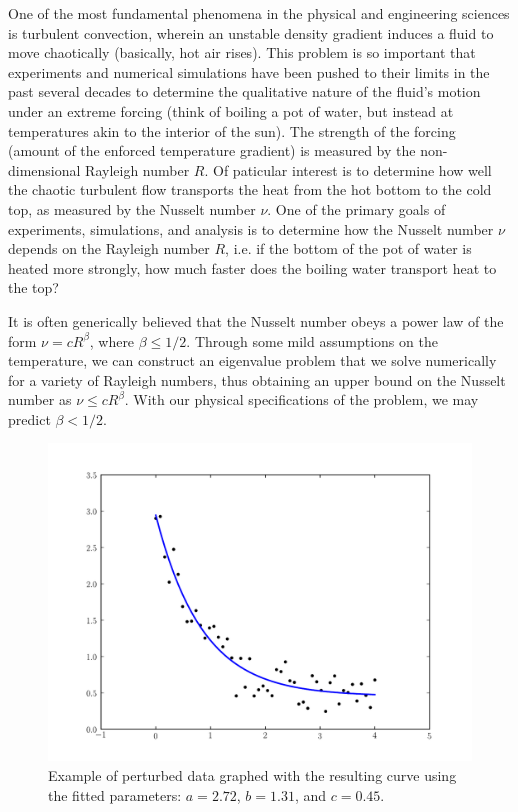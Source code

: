 One of the most fundamental phenomena in the physical and engineering sciences is turbulent convection, wherein an unstable density gradient induces a fluid to move chaotically (basically, hot air rises).  
This problem is so important that experiments and numerical simulations have been pushed to their limits in the past several decades to determine the qualitative nature of the fluid's motion under an extreme forcing (think of boiling a pot of water, but instead at temperatures akin to the interior of the sun).  
The strength of the forcing (amount of the enforced temperature gradient) is measured by the non-dimensional Rayleigh number $R$.  
Of paticular interest is to determine how well the chaotic turbulent flow transports the heat from the hot bottom to the cold top, as measured by the Nusselt number $\nu$.  
One of the primary goals of experiments, simulations, and analysis is to determine how the Nusselt number $\nu$ depends on the Rayleigh number $R$, i.e. if the bottom of the pot of water is heated more strongly, how much faster does the boiling water transport heat to the top?

It is often generically believed that the Nusselt number obeys a power law of the form $\nu = cR^\beta$, where $\beta \le 1/2$.  
Through some mild assumptions on the temperature, we can construct an eigenvalue problem that we solve numerically for a variety of Rayleigh numbers, thus obtaining an upper bound on the Nusselt number as $\nu \le cR^\beta$.  With our physical specifications of the problem, we may predict $\beta < 1/2$.

\begin{figure}
\includegraphics[width=\textwidth]{curve_fit.pdf}
\caption{Example of perturbed data graphed with the resulting curve using the fitted parameters: $a=2.72$,  $b=1.31$, and $c=0.45$.}
\label{opt:curve_fit}
\end{figure}

